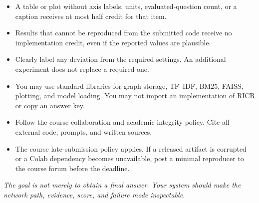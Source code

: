 \documentclass[11pt]{article}
\newcommand{\RICR}{{\mdseries\textsc{RICR}}\xspace}
\begin{document}
\begin{itemize}
  \item A table or plot without axis labels, units, evaluated-question count,
        or a caption receives at most half credit for that item.
  \item Results that cannot be reproduced from the submitted code receive no
        implementation credit, even if the reported values are plausible.
  \item Clearly label any deviation from the required settings. An additional
        experiment does not replace a required one.
  \item You may use standard libraries for graph storage, TF--IDF, BM25, FAISS,
        plotting, and model loading. You may not import an implementation of
        \RICR or copy an answer key.
  \item Follow the course collaboration and academic-integrity policy. Cite
        all external code, prompts, and written sources.
  \item The course late-submission policy applies. If a released artifact is
        corrupted or a Colab dependency becomes unavailable, post a minimal
        reproducer to the course forum before the deadline.
\end{itemize}

\vfill
\begin{center}
\textit{The goal is not merely to obtain a final answer. Your system should
make the network path, evidence, score, and failure mode inspectable.}
\end{center}
\end{document}
